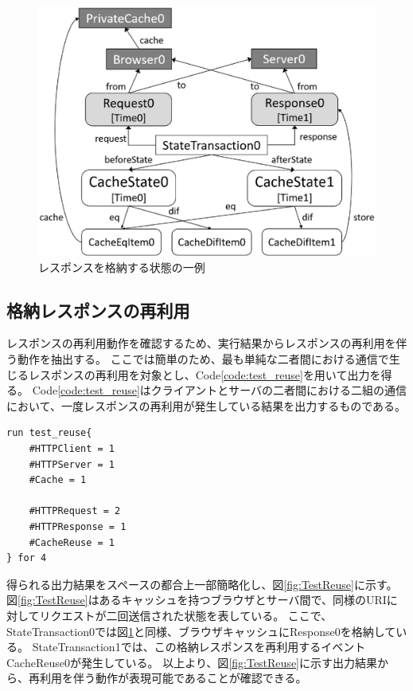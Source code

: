 \documentclass[12pt,a4paper]{jbook}
\begin{document}
\begin{figure}[htb]
\centering
\includegraphics[width=450pt]{./fig/TestStore.eps}
\caption{レスポンスを格納する状態の一例}
\label{fig:TestStore}
\end{figure}

\subsection{格納レスポンスの再利用}
レスポンスの再利用動作を確認するため、実行結果からレスポンスの再利用を伴う動作を抽出する。
ここでは簡単のため、最も単純な二者間における通信で生じるレスポンスの再利用を対象とし、Code\ref{code:test_reuse}を用いて出力を得る。
Code\ref{code:test_reuse}はクライアントとサーバの二者間における二組の通信において、一度レスポンスの再利用が発生している結果を出力するものである。

\begin{lstlisting}[caption=格納レスポンスの再利用, label=code:test_reuse]
run test_reuse{
	#HTTPClient = 1
	#HTTPServer = 1
	#Cache = 1

	#HTTPRequest = 2
	#HTTPResponse = 1
	#CacheReuse = 1
} for 4
\end{lstlisting}

得られる出力結果をスペースの都合上一部簡略化し、図\ref{fig:TestReuse}に示す。
図\ref{fig:TestReuse}はあるキャッシュを持つブラウザとサーバ間で、同様のURIに対してリクエストが二回送信された状態を表している。
ここで、StateTransaction0では図\ref{fig:TestStore}と同様、ブラウザキャッシュにResponse0を格納している。
StateTransaction1では、この格納レスポンスを再利用するイベントCacheReuse0が発生している。
以上より、図\ref{fig:TestReuse}に示す出力結果から、再利用を伴う動作が表現可能であることが確認できる。
\end{document}

